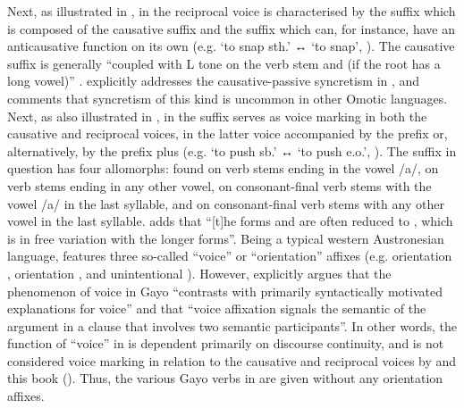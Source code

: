 Next, as illustrated in , in  the reciprocal voice is characterised by the suffix  which is composed of the causative suffix  and the suffix  which can, for instance, have an anticausative function on its own (e.g.  ‘to snap sth.’ ↔  ‘to snap’, \citealt[284]{hellenthal:2010}). The causative suffix is generally “coupled with L tone on the verb stem and  (if the root has a long vowel)” \citep[373]{hellenthal:2010}. \cite[395]{hellenthal:2010} explicitly addresses the causative-passive syncretism in , and comments that syncretism of this kind is uncommon in other Omotic languages. Next, as also illustrated in , in  the suffix  serves as voice marking in both the causative and reciprocal voices, in the latter voice accompanied by the prefix  or, alternatively, by the prefix  plus  (e.g.  ‘to push sb.’ ↔  ‘to push e.o.’, \citealt[154]{eades:2005}). The suffix in question has four allomorphs:  found on verb stems ending in the vowel /a/,  on verb stems ending in any other vowel,  on consonant-final verb stems with the vowel /a/ in the last syllable, and  on consonant-final verb stems with any other vowel in the last syllable. \cite[39f.]{eades:2005} adds that “[t]he forms  and  are often reduced to , which is in free variation with the longer forms”. Being a typical western Austronesian language,  features three so-called “voice” or “orientation” affixes (e.g.  orientation ,  orientation , and unintentional  ). However, \cite[167]{eades:2005} explicitly argues that the phenomenon of voice in Gayo “contrasts with primarily syntactically motivated explanations for voice” and that “voice affixation signals the semantic  of the  argument in a clause that involves two semantic participants”. In other words, the function of “voice” in  is dependent primarily on discourse continuity, and is not considered voice marking in relation to the causative and reciprocal voices by \cite[162f., 186ff.]{eades:2005} and this book (). Thus, the various Gayo verbs in  are given without any orientation affixes. 

